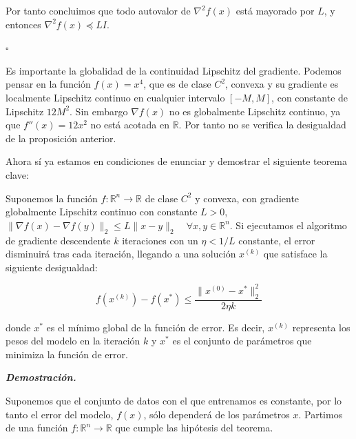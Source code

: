 Por tanto concluimos que todo autovalor de $\nabla ^2 f(x)$ está mayorado por $L$, y entonces $\nabla ^2 f(x) \preceq LI$.

\begin{flushright}
    $\square$
\end{flushright} 

\begin{observacion}
	Es importante la globalidad de la continuidad Lipschitz del gradiente. Podemos pensar en la función $f(x)=x^4$, que es de clase $C^2$, convexa y su gradiente es localmente Lipschitz continuo en cualquier intervalo $[ -M,M ]$, con constante de Lipschitz $12M^2$. Sin embargo $\nabla f(x)$ no es globalmente Lipschitz continuo, ya que $f''(x)=12x^2$ no está acotada en $\mathbb{R}$. Por tanto no se verifica la desigualdad de la proposición anterior.
\end{observacion}




Ahora sí ya estamos en condiciones de enunciar y demostrar el siguiente teorema clave:

\begin{teorema}\label{proof:gdconvex}
    Suponemos la función $f: \mathbb{R}^n \rightarrow \mathbb{R}$ de clase $C^2$ y convexa, con gradiente globalmente Lipschitz continuo con constante $L>0$, $\| \nabla f(x) - \nabla f(y) \|_2 \leq L \|x-y\|_2 \quad \forall x, y \in \mathbb{R}^n$. Si ejecutamos el algoritmo de gradiente descendente $k$ iteraciones con un $\eta<1/L$ constante, el error disminuirá tras cada iteración, llegando a una solución $x^{(k)}$ que satisface la siguiente desigualdad:

    $$f(x^{(k)})-f(x^*) \leq \frac{\|x^{(0)}-x^* \|^2_2}{2\eta k}$$

    donde $x^*$ es el mínimo global de la función de error. Es decir, $x^{(k)}$ representa los pesos del modelo en la iteración $k$ y $x^*$ es el conjunto de parámetros que minimiza la función de error.
\end{teorema}

\vspace{1cm}

\begin{flushleft}
   \textbf{\textit{Demostración.}}
\end{flushleft} 

Suponemos que el conjunto de datos con el que entrenamos es constante, por lo tanto el error del modelo, $f(x)$, sólo dependerá de los parámetros $x$. Partimos de una función $f: \mathbb{R}^n \rightarrow \mathbb{R}$ que cumple las hipótesis del teorema. 

